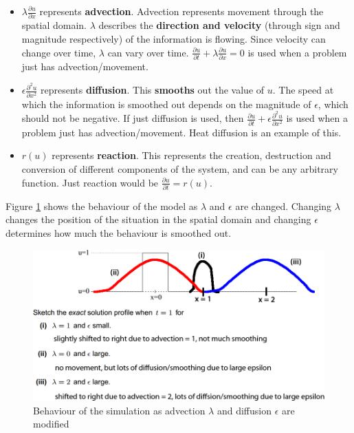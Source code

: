 \documentclass{article}
\begin{document}
\begin{itemize}
	\item $\lambda\frac{\partial u}{\partial x}$  represents \textbf{advection}. Advection represents movement through the spatial domain. $\lambda$ describes the \textbf{direction and velocity} (through sign and magnitude respectively) of the information is flowing. Since velocity can change over time, $\lambda$ can vary over time. $\frac{\partial u}{\partial t} + \lambda\frac{\partial u}{\partial x} = 0$ is used when a problem just has advection/movement.
	\item $\epsilon \frac{\partial^2 u}{\partial x^2}$ represents \textbf{diffusion}. This \textbf{smooths} out the value of $u$. The speed at which the information is smoothed out depends on the magnitude of $\epsilon$, which should not be negative. If just diffusion is used, then $\frac{\partial u}{\partial t} + \epsilon\frac{\partial^2 u}{\partial x^2}$ is used when a problem just has advection/movement. Heat diffusion is an example of this.
	\item $r(u)$ represents \textbf{reaction}. This represents the creation, destruction and conversion of different components of the system, and can be any arbitrary function. Just reaction would be $\frac{\partial u}{\partial t} = r(u)$.
\end{itemize}
Figure \ref{fig:advection-diffusion-behaviour} shows the behaviour of the model as $\lambda$ and $\epsilon$ are changed. Changing $\lambda$ changes the position of the situation in the spatial domain and changing $\epsilon$ determines how much the behaviour is smoothed out.

\begin{figure}
	\centering
	\includegraphics[scale=0.4]{figures/ibvp-behaviour.png}
	\caption{Behaviour of the simulation as advection $\lambda$ and diffusion $\epsilon$ are modified}
	\label{fig:advection-diffusion-behaviour}
\end{figure}
\end{document}
